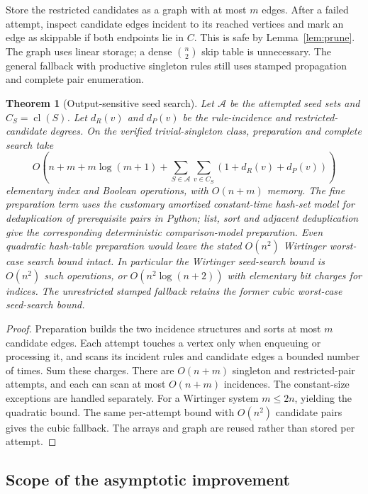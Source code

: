 \documentclass[11pt,a4paper]{article}
\newtheorem{theorem}{Theorem}[section]
\theoremstyle{definition}\newtheorem{definition}[theorem]{Definition}
\theoremstyle{remark}\newtheorem{remark}[theorem]{Remark}
\newcommand{\cl}{\operatorname{cl}}
\begin{document}
Store the restricted candidates as a graph with at most $m$ edges. After
a failed attempt, inspect candidate edges incident to its reached vertices
and mark an edge as skippable if both endpoints lie in $C$. This is safe
by Lemma~\ref{lem:prune}. The graph uses linear storage; a dense
$\binom n2$ skip table is unnecessary. The general fallback with productive
singleton rules still uses stamped propagation and complete pair enumeration.

\begin{theorem}[Output-sensitive seed search]\label{thm:seedcost}
Let $\mathcal A$ be the attempted seed sets and $C_S=\cl(S)$. Let $d_R(v)$
and $d_P(v)$ be the rule-incidence and restricted-candidate degrees. On
the verified trivial-singleton class, preparation and complete search take
\[
 O\!\left(n+m+m\log(m+1)+
       \sum_{S\in\mathcal A}\sum_{v\in C_S}
       (1+d_R(v)+d_P(v))\right)
\]
elementary index and Boolean operations, with $O(n+m)$ memory.
The fine preparation term uses the customary amortized constant-time
hash-set model for deduplication of prerequisite pairs in Python; list,
sort and adjacent deduplication give the corresponding deterministic
comparison-model preparation. Even quadratic hash-table preparation
would leave the stated $O(n^2)$ Wirtinger worst-case search bound intact.
In particular the Wirtinger seed-search bound is $O(n^2)$ such operations,
or $O(n^2\log(n+2))$ with elementary bit charges for indices.
The unrestricted stamped fallback retains the former cubic worst-case
seed-search bound.
\end{theorem}
\begin{proof}
Preparation builds the two incidence structures and sorts at most $m$
candidate edges. Each attempt touches a vertex only when enqueuing or
processing it, and scans its incident rules and candidate edges a bounded
number of times. Sum these charges. There are $O(n+m)$ singleton
and restricted-pair attempts, and each can scan at most $O(n+m)$ incidences.
The constant-size exceptions are handled separately. For a Wirtinger
system $m\leq2n$, yielding the quadratic bound. The same
per-attempt bound with $O(n^2)$ candidate pairs gives the cubic fallback.
The arrays and graph are reused rather than stored per attempt.
\end{proof}

\subsection{Scope of the asymptotic improvement}
\end{document}
